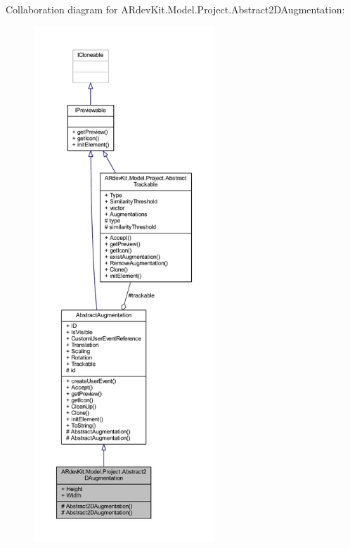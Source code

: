Collaboration diagram for A\-Rdev\-Kit.\-Model.\-Project.\-Abstract2\-D\-Augmentation\-:
\nopagebreak
\begin{figure}[H]
\begin{center}
\leavevmode
\includegraphics[height=550pt]{class_a_rdev_kit_1_1_model_1_1_project_1_1_abstract2_d_augmentation__coll__graph}
\end{center}
\end{figure}
